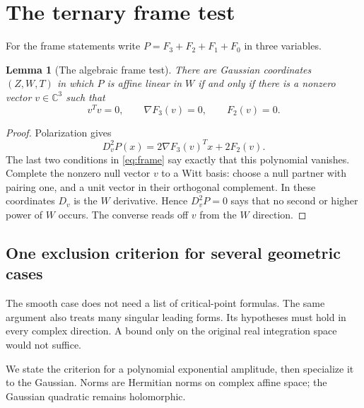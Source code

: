 \documentclass[11pt]{article}
\newtheorem{lemma}[theorem]{Lemma}
\theoremstyle{definition}\newtheorem{definition}[theorem]{Definition}
\theoremstyle{remark}\newtheorem{remark}[theorem]{Remark}
\newcommand{\C}{\mathbb C}
\begin{document}
\section{The ternary frame test}
For the frame statements write $P=F_3+F_2+F_1+F_0$ in three variables.
\begin{lemma}[The algebraic frame test]\label{lem:frame}
There are Gaussian coordinates $(Z,W,T)$ in which $P$ is affine linear
in $W$ if and only if there is a nonzero vector $v\in\C^3$ such that
\begin{equation}\label{eq:frame}
 v^Tv=0,\qquad \nabla F_3(v)=0,\qquad F_2(v)=0.
\end{equation}
\end{lemma}
\begin{proof}
Polarization gives
\[
 D_v^2P(x)=2\nabla F_3(v)^Tx+2F_2(v).
\]
The last two conditions in \eqref{eq:frame} say exactly that this
polynomial vanishes. Complete the nonzero null vector $v$ to a Witt
basis: choose a null partner with pairing one, and a unit vector in
their orthogonal complement. In these coordinates $D_v$ is the $W$
derivative. Hence $D_v^2P=0$ says that no second or higher power of
$W$ occurs. The converse reads off $v$ from the $W$ direction.
\end{proof}


\subsection{One exclusion criterion for several geometric cases}
\label{sec:gradientexclusion}

The smooth case does not need a list of critical-point formulas.
The same argument also treats many singular leading forms. Its
hypotheses must hold in every complex direction. A bound only on
the original real integration space would not suffice.

We state the criterion for a polynomial exponential amplitude, then
specialize it to the Gaussian. Norms are Hermitian norms on complex
affine space; the Gaussian quadratic remains holomorphic.
\end{document}
